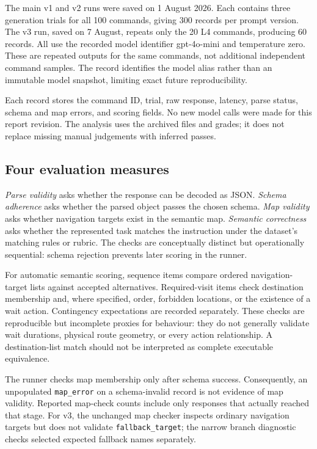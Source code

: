 \documentclass[journal]{IEEEtran}
\newcommand{\field}[1]{\texttt{#1}}
\begin{document}
The main v1 and v2 runs were saved on 1 August 2026. Each contains three generation trials for all 100 commands, giving 300 records per prompt version. The v3 run, saved on 7 August, repeats only the 20 L4 commands, producing 60 records. All use the recorded model identifier gpt-4o-mini and temperature zero. These are repeated outputs for the same commands, not additional independent command samples. The record identifies the model alias rather than an immutable model snapshot, limiting exact future reproducibility.

Each record stores the command ID, trial, raw response, latency, parse status, schema and map errors, and scoring fields. No new model calls were made for this report revision. The analysis uses the archived files and grades; it does not replace missing manual judgements with inferred passes.

\subsection{Four evaluation measures}
\emph{Parse validity} asks whether the response can be decoded as JSON. \emph{Schema adherence} asks whether the parsed object passes the chosen schema. \emph{Map validity} asks whether navigation targets exist in the semantic map. \emph{Semantic correctness} asks whether the represented task matches the instruction under the dataset's matching rules or rubric. The checks are conceptually distinct but operationally sequential: schema rejection prevents later scoring in the runner.

For automatic semantic scoring, sequence items compare ordered navigation-target lists against accepted alternatives. Required-visit items check destination membership and, where specified, order, forbidden locations, or the existence of a wait action. Contingency expectations are recorded separately. These checks are reproducible but incomplete proxies for behaviour: they do not generally validate wait durations, physical route geometry, or every action relationship. A destination-list match should not be interpreted as complete executable equivalence.

The runner checks map membership only after schema success. Consequently, an unpopulated \field{map\_error} on a schema-invalid record is not evidence of map validity. Reported map-check counts include only responses that actually reached that stage. For v3, the unchanged map checker inspects ordinary navigation targets but does not validate \field{fallback\_target}; the narrow branch diagnostic checks selected expected fallback names separately.
\end{document}
